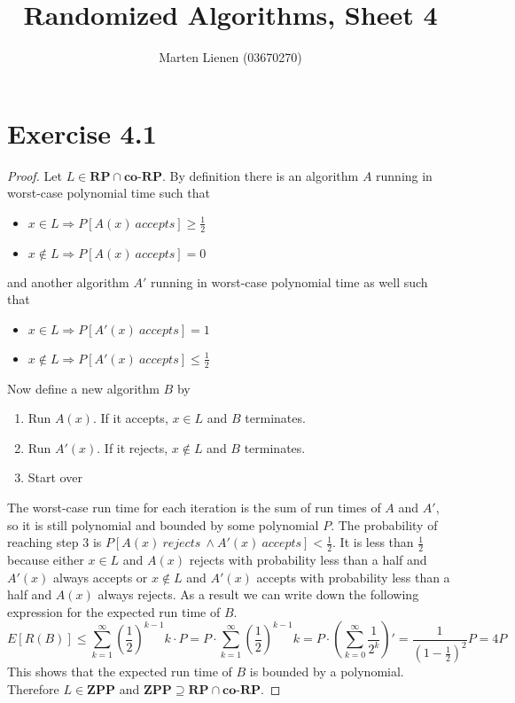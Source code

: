 \documentclass[10pt,a4paper]{article}
\title{Randomized Algorithms, Sheet 4}
\author{Marten Lienen (03670270)}
\begin{document}
\maketitle

\section*{Exercise 4.1}

\begin{proof}
  Let $L \in \mathbf{RP} \cap \mathbf{co\text{-}RP}$.
  By definition there is an algorithm $A$ running in worst-case polynomial time such that
  \begin{itemize}
  \item $x \in L \Rightarrow P[A(x)\ accepts] \ge \frac{1}{2}$
  \item $x \notin L \Rightarrow P[A(x)\ accepts] = 0$
  \end{itemize}
  and another algorithm $A'$ running in worst-case polynomial time as well such that
  \begin{itemize}
  \item $x \in L \Rightarrow P[A'(x)\ accepts] = 1$
  \item $x \notin L \Rightarrow P[A'(x)\ accepts] \le \frac{1}{2}$
  \end{itemize}
  Now define a new algorithm $B$ by
  \begin{enumerate}
  \item Run $A(x)$. If it accepts, $x \in L$ and $B$ terminates.
  \item Run $A'(x)$. If it rejects, $x \notin L$ and $B$ terminates.
  \item Start over
  \end{enumerate}
  The worst-case run time for each iteration is the sum of run times of $A$ and $A'$, so it is still polynomial and bounded by some polynomial $P$.
  The probability of reaching step 3 is $P[A(x)\ rejects\ \land A'(x)\ accepts] < \frac{1}{2}$.
  It is less than $\frac{1}{2}$ because either $x \in L$ and $A(x)$ rejects with probability less than a half and $A'(x)$ always accepts or $x \notin L$ and $A'(x)$ accepts with probability less than a half and $A(x)$ always rejects.
  As a result we can write down the following expression for the expected run time of $B$.
  \begin{equation*}
    E[R(B)] \le \sum_{k = 1}^{\infty} \left( \frac{1}{2} \right)^{k - 1} k \cdot P = P \cdot \sum_{k = 1}^{\infty} \left( \frac{1}{2} \right)^{k - 1} k = P \cdot \left( \sum_{k = 0}^{\infty} \frac{1}{2^{k}} \right)' = \frac{1}{\left( 1 - \frac{1}{2} \right)^{2}}P = 4P
  \end{equation*}
  This shows that the expected run time of $B$ is bounded by a polynomial.
  Therefore $L \in \mathbf{ZPP}$ and $\mathbf{ZPP} \supseteq \mathbf{RP} \cap \mathbf{co \text{-} RP}$.


\end{proof}
\end{document}
